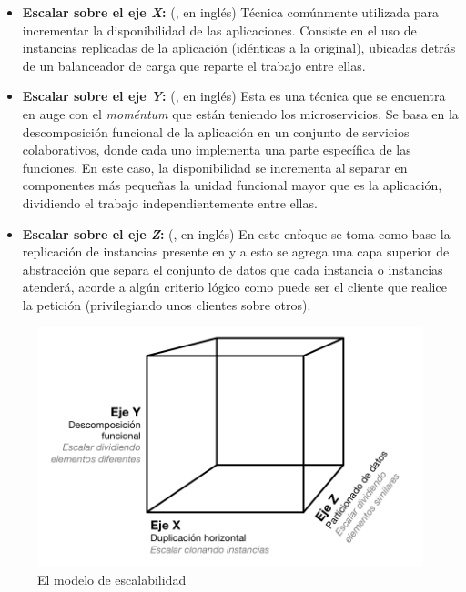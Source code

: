 \begin{itemize}
  \item \textbf{Escalar sobre el eje \textit{X}:} (, en inglés) Técnica comúnmente utilizada para incrementar la disponibilidad de las aplicaciones. Consiste en el uso de instancias replicadas de la aplicación (idénticas a la original), ubicadas detrás de un balanceador de carga que reparte el trabajo entre ellas.
  \item \textbf{Escalar sobre el eje \textit{Y}:} (, en inglés) Esta es una técnica que se encuentra en auge con el \textit{moméntum} que están teniendo los microservicios. Se basa en la descomposición funcional de la aplicación en un conjunto de servicios colaborativos, donde cada uno implementa una parte específica de las funciones. En este caso, la disponibilidad se incrementa al separar en componentes más pequeñas la unidad funcional mayor que es la aplicación, dividiendo el trabajo independientemente entre ellas.
  \item \textbf{Escalar sobre el eje \textit{Z}:} (, en inglés) En este enfoque se toma como base la replicación de instancias presente en  y a esto se agrega una capa superior de abstracción que separa el conjunto de datos que cada instancia o instancias atenderá, acorde a algún criterio lógico como puede ser el cliente que realice la petición (privilegiando unos clientes sobre otros).
\end{itemize}

\begin{figure}[H]
  \includegraphics[width=\linewidth]{src/images/04-capitulo-4/scale-cube.png}
  \caption{El modelo de escalabilidad }
  \label{fig:scale-cube}
\end{figure}

